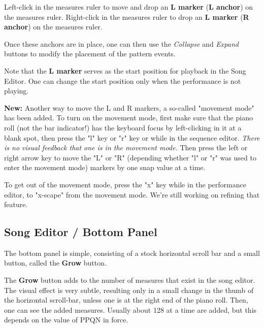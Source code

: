    Left-click in the measures ruler to move and drop an
   \textbf{L marker} (\textbf{L anchor}) on the measures ruler.
   Right-click in the measures ruler to drop an
   \textbf{L marker} (\textbf{R anchor}) on the measures ruler.

   Once these anchors are in place, one can then use
	the \textsl{Collapse} and \textsl{Expand} buttons to modify the
   placement of the pattern events.

   Note that the \textbf{L marker} serves as the start position for playback
   in the Song Editor.  One can change the start position only when the
   performance is not playing.

   \textbf{New:}
   Another way to move the L and R markers, a so-called "movement mode"
   has been added.
   To turn on the movement mode, first make sure that the piano roll (not the
   bar indicator!) has the
   keyboard focus by left-clicking in it at a blank spot, then press the
   "l" key or
   "r" key or
   while in the sequence editor.
   \textsl{There is no visual feedback that one is in the movement mode.}
   Then press the left or right arrow key to move the "L" or "R" (depending
   whether "l" or "r" was used to enter the movement mode) markers by one
   snap value at a time.

   To get out of the movement mode, press the
   "x" key while in the performance editor, to "x-scape" from the movement
   mode.  We're still working on refining that feature.

\subsection{Song Editor / Bottom Panel}
\label{subsec:seq64_song_editor_bottom}

   The bottom panel is simple, consisting of a stock horizontal scroll bar
   and a small button, called the \textbf{Grow} button.

   The \textbf{Grow} button adds to the number of measures that exist
   in the song editor. The visual effect is very subtle, resulting only
   in a small change in the thumb of the horizontal scroll-bar, unless one
   is at the right end of the piano roll.  Then, one can see the added
   measures.  Usually about 128 at a time are added, but this depends on the
   value of PPQN in force.

